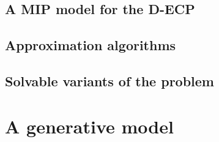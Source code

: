 \subsection{A MIP model for the \acrshort{D-ECP}}%
\label{sub:a_mip_model_for_the_ecp}

\subsection{Approximation algorithms}%
\label{sub:approximation_algorithms}

\subsection{Solvable variants of the problem}%
\label{sub:solvable_variants_of_the_problem}

\section{A generative model}%
\label{sec:generative_model}



